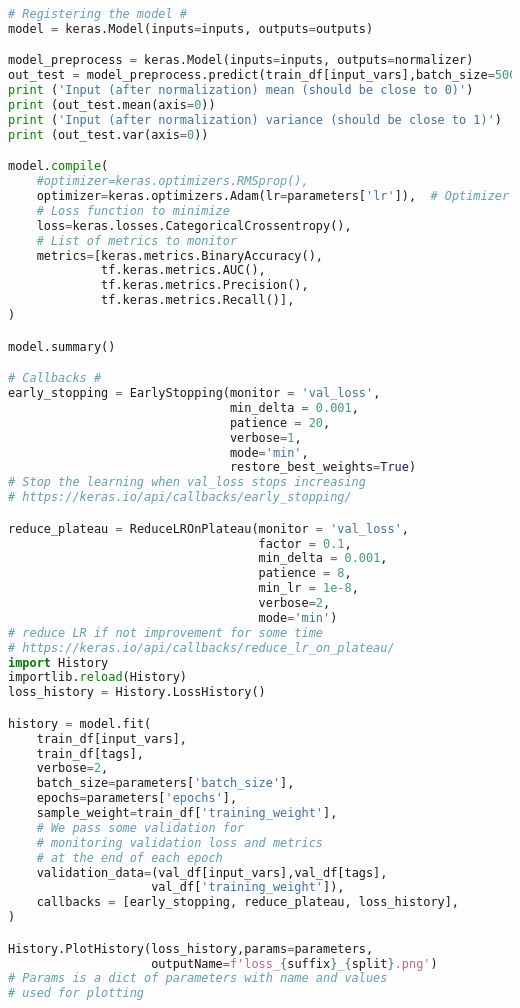 \begin{lstlisting}[language=Python, caption=Python module of the analysis used in Bamboo framework, label={dnncode}]
# Registering the model #
model = keras.Model(inputs=inputs, outputs=outputs)

model_preprocess = keras.Model(inputs=inputs, outputs=normalizer)
out_test = model_preprocess.predict(train_df[input_vars],batch_size=5000)
print ('Input (after normalization) mean (should be close to 0)')
print (out_test.mean(axis=0))
print ('Input (after normalization) variance (should be close to 1)')
print (out_test.var(axis=0))

model.compile(
    #optimizer=keras.optimizers.RMSprop(),
    optimizer=keras.optimizers.Adam(lr=parameters['lr']),  # Optimizer
    # Loss function to minimize
    loss=keras.losses.CategoricalCrossentropy(),
    # List of metrics to monitor
    metrics=[keras.metrics.BinaryAccuracy(),
             tf.keras.metrics.AUC(),
             tf.keras.metrics.Precision(),
             tf.keras.metrics.Recall()],
)

model.summary()

# Callbacks #
early_stopping = EarlyStopping(monitor = 'val_loss',
                               min_delta = 0.001, 
                               patience = 20,
                               verbose=1,
                               mode='min',
                               restore_best_weights=True)
# Stop the learning when val_loss stops increasing 
# https://keras.io/api/callbacks/early_stopping/

reduce_plateau = ReduceLROnPlateau(monitor = 'val_loss',
                                   factor = 0.1,
                                   min_delta = 0.001, 
                                   patience = 8,
                                   min_lr = 1e-8,
                                   verbose=2,
                                   mode='min')
# reduce LR if not improvement for some time 
# https://keras.io/api/callbacks/reduce_lr_on_plateau/
import History 
importlib.reload(History)
loss_history = History.LossHistory()

history = model.fit(
    train_df[input_vars],
    train_df[tags],
    verbose=2,
    batch_size=parameters['batch_size'],
    epochs=parameters['epochs'],
    sample_weight=train_df['training_weight'],
    # We pass some validation for
    # monitoring validation loss and metrics
    # at the end of each epoch
    validation_data=(val_df[input_vars],val_df[tags],
                    val_df['training_weight']),
    callbacks = [early_stopping, reduce_plateau, loss_history],
)

History.PlotHistory(loss_history,params=parameters,
                    outputName=f'loss_{suffix}_{split}.png')
# Params is a dict of parameters with name and values
# used for plotting


\end{lstlisting}
